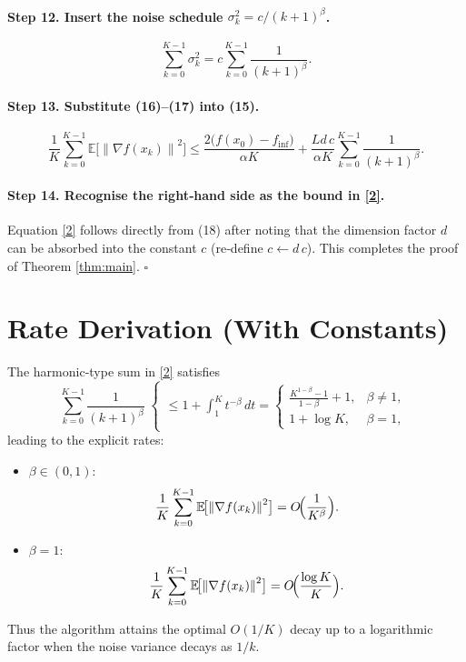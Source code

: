 \documentclass[11pt]{article}
\newcommand{\EE}{\mathbb{E}}
\newcommand{\norm}[1]{\left\lVert#1\right\rVert}
\begin{document}
\paragraph{Step 12. Insert the noise schedule $\sigma_{k}^{2}=c/(k+1)^{\beta}$.}
\[
\sum_{k=0}^{K-1}\sigma_{k}^{2}
= c\sum_{k=0}^{K-1}\frac{1}{(k+1)^{\beta}}.
\tag{17}
\]

\paragraph{Step 13. Substitute (16)–(17) into (15).}
\[
\frac{1}{K}\sum_{k=0}^{K-1}\EE\!\bigl[\norm{\nabla f(x_{k})}^{2}\bigr]
\le
\frac{2\bigl(f(x_{0})-f_{\inf}\bigr)}{\alpha K}
+\frac{L d\,c}{\alpha K}\sum_{k=0}^{K-1}\frac{1}{(k+1)^{\beta}}.
\tag{18}
\]

\paragraph{Step 14. Recognise the right‑hand side as the bound in \eqref{2}.}  
Equation \eqref{2} follows directly from (18) after noting that the dimension factor $d$ can be absorbed into the constant $c$ (re‑define $c\leftarrow d\,c$). This completes the proof of Theorem \ref{thm:main}. \hfill $\square$

\section*{Rate Derivation (With Constants)}
The harmonic‑type sum in \eqref{2} satisfies
\[
\sum_{k=0}^{K-1}\frac{1}{(k+1)^{\beta}}
\;\begin{cases}
\displaystyle \le 1+\int_{1}^{K}\!t^{-\beta}\,dt
= \begin{cases}
\displaystyle \frac{K^{1-\beta}-1}{1-\beta}+1, & \beta\neq1,\\[6pt]
\displaystyle 1+\log K, & \beta=1,
\end{cases}
\end{cases}
\tag{19}
\]
leading to the explicit rates:

\begin{itemize}
\item $\beta\in(0,1)$:
\[
\frac{1}{K}\sum_{k=0}^{K-1}\EE\!\bigl[\norm{\nabla f(x_{k})}^{2}\bigr]
=O\!\Bigl(\frac{1}{K^{\beta}}\Bigr).
\]
\item $\beta=1$:
\[
\frac{1}{K}\sum_{k=0}^{K-1}\EE\!\bigl[\norm{\nabla f(x_{k})}^{2}\bigr]
=O\!\Bigl(\frac{\log K}{K}\Bigr).
\]
\end{itemize}
Thus the algorithm attains the optimal $O(1/K)$ decay up to a logarithmic factor when the noise variance decays as $1/k$.
\end{document}
